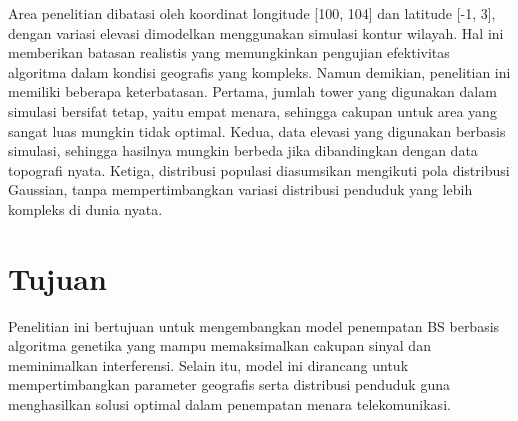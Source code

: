 Area penelitian dibatasi oleh koordinat longitude [100, 104] dan latitude [-1, 3], dengan variasi elevasi dimodelkan menggunakan simulasi kontur wilayah. Hal ini memberikan batasan realistis yang memungkinkan pengujian efektivitas algoritma dalam kondisi geografis yang kompleks. Namun demikian, penelitian ini memiliki beberapa keterbatasan. Pertama, jumlah tower yang digunakan dalam simulasi bersifat tetap, yaitu empat menara, sehingga cakupan untuk area yang sangat luas mungkin tidak optimal. Kedua, data elevasi yang digunakan berbasis simulasi, sehingga hasilnya mungkin berbeda jika dibandingkan dengan data topografi nyata. Ketiga, distribusi populasi diasumsikan mengikuti pola distribusi Gaussian, tanpa mempertimbangkan variasi distribusi penduduk yang lebih kompleks di dunia nyata.

\section{Tujuan}
Penelitian ini bertujuan untuk mengembangkan model penempatan BS berbasis algoritma genetika yang mampu memaksimalkan cakupan sinyal dan meminimalkan interferensi. Selain itu, model ini dirancang untuk mempertimbangkan parameter geografis serta distribusi penduduk guna menghasilkan solusi optimal dalam penempatan menara telekomunikasi.